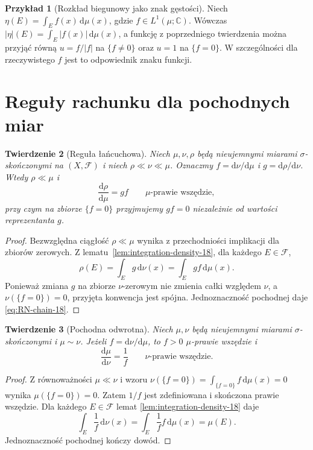 \documentclass[11pt,a4paper,oneside]{book}
\numberwithin{equation}{chapter}
\theoremstyle{plain}
\newtheorem{twierdzenie}{Twierdzenie}[chapter]
\theoremstyle{definition}
\newtheorem{przyklad}[twierdzenie]{Przykład}
\theoremstyle{remark}
\begin{document}
\begin{przyklad}[Rozkład biegunowy jako znak gęstości]
Niech $\eta(E)=\int_E f(x)\,\mathrm d\mu(x)$,
gdzie $f\in L^1(\mu;\mathbb C)$. Wówczas
$|\eta|(E)=\int_E|f(x)|\,\mathrm d\mu(x)$,
a funkcję z poprzedniego twierdzenia można przyjąć
równą $u=f/|f|$ na $\{f\neq0\}$ oraz $u=1$
na $\{f=0\}$. W szczególności dla rzeczywistego $f$
jest to odpowiednik znaku funkcji.
\end{przyklad}

\section{Reguły rachunku dla pochodnych miar}
\begin{twierdzenie}[Reguła łańcuchowa]
\label{thm:RN-chain-18}
Niech $\mu,\nu,\rho$ będą nieujemnymi miarami
$\sigma$-skończonymi na $(X,\mathcal F)$
i niech $\rho\ll\nu\ll\mu$.
Oznaczmy $f=\mathrm d\nu/\mathrm d\mu$
i $g=\mathrm d\rho/\mathrm d\nu$.
Wtedy $\rho\ll\mu$ i
\begin{equation}\label{eq:RN-chain-18}
\frac{\mathrm d\rho}{\mathrm d\mu}
=g f\qquad\mu\text{-prawie wszędzie},
\end{equation}
przy czym na zbiorze $\{f=0\}$ przyjmujemy $gf=0$
niezależnie od wartości reprezentanta $g$.
\end{twierdzenie}
\begin{proof}
Bezwzględna ciągłość $\rho\ll\mu$ wynika
z przechodniości implikacji dla zbiorów zerowych.
Z lematu~\ref{lem:integration-density-18}, dla każdego
$E\in\mathcal F$,
\[
\rho(E)=\int_Eg\,\mathrm d\nu(x)
=\int_Eg f\,\mathrm d\mu(x).
\]
Ponieważ zmiana $g$ na zbiorze $\nu$-zerowym nie zmienia
całki względem $\nu$, a $\nu(\{f=0\})=0$,
przyjęta konwencja jest spójna. Jednoznaczność
pochodnej daje \eqref{eq:RN-chain-18}.
\end{proof}

\begin{twierdzenie}[Pochodna odwrotna]
\label{thm:RN-inverse-18}
Niech $\mu,\nu$ będą nieujemnymi miarami
$\sigma$-skończonymi i $\mu\sim\nu$.
Jeżeli $f=\mathrm d\nu/\mathrm d\mu$, to
$f>0$ $\mu$-prawie wszędzie i
\begin{equation}\label{eq:RN-inverse-18}
\frac{\mathrm d\mu}{\mathrm d\nu}=\frac1f
\qquad\nu\text{-prawie wszędzie}.
\end{equation}
\end{twierdzenie}
\begin{proof}
Z równoważności $\mu\ll\nu$ i wzoru
$\nu(\{f=0\})=\int_{\{f=0\}}f\,\mathrm d\mu(x)=0$
wynika $\mu(\{f=0\})=0$. Zatem $1/f$ jest
zdefiniowana i skończona prawie wszędzie.
Dla każdego $E\in\mathcal F$ lemat
\ref{lem:integration-density-18} daje
\[
\int_E\frac1f\,\mathrm d\nu(x)
=\int_E\frac1f f\,\mathrm d\mu(x)=\mu(E).
\]
Jednoznaczność pochodnej kończy dowód.
\end{proof}
\end{document}

